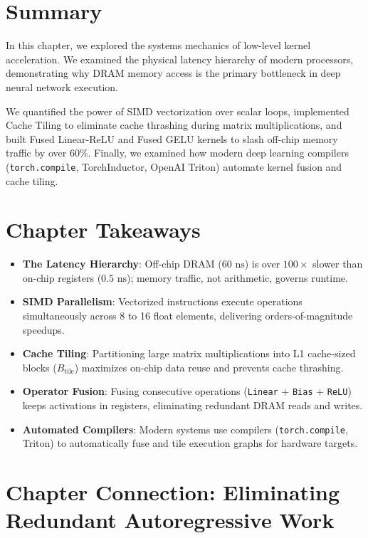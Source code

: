 \documentclass[
  letterpaper,
]{scrbook}
\providecommand{\tightlist}{%
  \setlength{\itemsep}{0pt}\setlength{\parskip}{0pt}}
\begin{document}
\section{Summary}\label{summary-17}

In this chapter, we explored the systems mechanics of low-level kernel
acceleration. We examined the physical latency hierarchy of modern
processors, demonstrating why DRAM memory access is the primary
bottleneck in deep neural network execution.

We quantified the power of SIMD vectorization over scalar loops,
implemented Cache Tiling to eliminate cache thrashing during matrix
multiplications, and built Fused Linear-ReLU and Fused GELU kernels to
slash off-chip memory traffic by over 60\%. Finally, we examined how
modern deep learning compilers (\texttt{torch.compile}, TorchInductor,
OpenAI Triton) automate kernel fusion and cache tiling.

\section{Chapter Takeaways}\label{chapter-takeaways-17}

\begin{itemize}
\tightlist
\item
  \textbf{The Latency Hierarchy}: Off-chip DRAM (\(60\text{ ns}\)) is
  over \(100\times\) slower than on-chip registers (\(0.5\text{ ns}\));
  memory traffic, not arithmetic, governs runtime.
\item
  \textbf{SIMD Parallelism}: Vectorized instructions execute operations
  simultaneously across 8 to 16 float elements, delivering
  orders-of-magnitude speedups.
\item
  \textbf{Cache Tiling}: Partitioning large matrix multiplications into
  L1 cache-sized blocks (\(B_{\text{tile}}\)) maximizes on-chip data
  reuse and prevents cache thrashing.
\item
  \textbf{Operator Fusion}: Fusing consecutive operations
  (\texttt{Linear} + \texttt{Bias} + \texttt{ReLU}) keeps activations in
  registers, eliminating redundant DRAM reads and writes.
\item
  \textbf{Automated Compilers}: Modern systems use compilers
  (\texttt{torch.compile}, Triton) to automatically fuse and tile
  execution graphs for hardware targets.
\end{itemize}

\section{Chapter Connection: Eliminating Redundant Autoregressive
Work}\label{chapter-connection-eliminating-redundant-autoregressive-work}
\end{document}
